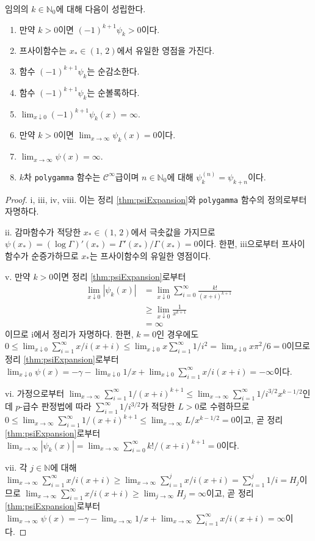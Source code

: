 \begin{theorem}
    임의의 $k\in\mathbb{N}_0$에 대해 다음이 성립한다.
    \begin{enumerate}
        \item 만약 $k>0$이면 $(-1)^{k+1}\psi_k>0$이다.
        \item 프사이함수는 $x_*\in(1,\,2)$에서 유일한 영점을 가진다.
        \item 함수 $(-1)^{k+1}\psi_k$는 순감소한다.
        \item 함수 $(-1)^{k+1}\psi_k$는 순볼록하다.
        \item $\lim_{x\downarrow0}(-1)^{k+1}\psi_k(x)=\infty$.
        \item 만약 $k>0$이면 $\lim_{x\to\infty}\psi_k(x)=0$이다.
        \item $\lim_{x\to\infty}\psi(x)=\infty$.
        \item $k$차 \texttt{polygamma} 함수는 $\mathcal{C}^\infty$급이며 $n\in\mathbb{N}_0$에 대해 $\psi_k^{(n)}=\psi_{k+n}$이다.
    \end{enumerate}
\end{theorem}

\begin{proof}
    i, iii, iv, viii. 이는 정리 \ref{thm:psiExpansion}와 \texttt{polygamma} 함수의 정의로부터 자명하다.

    ii. 감마함수가 적당한 $x_*\in(1,\,2)$에서 극솟값을 가지므로 $\psi(x_*)=(\log\Gamma)'(x_*)=\Gamma'(x_*)/\Gamma(x_*)=0$이다. 한편, iii으로부터 프사이함수가 순증가하므로 $x_*$는 프사이함수의 유일한 영점이다.

    v. 만약 $k>0$이면 정리 \ref{thm:psiExpansion}로부터
    \begin{align*}
        \lim_{x\downarrow0}|\psi_k(x)|&=\lim_{x\downarrow0}\sum_{i=0}^\infty\frac{k!}{(x+i)^{k+1}}\\
        &\geq\lim_{x\downarrow0}\frac{1}{x^{k+1}}\\
        &=\infty
    \end{align*}
    이므로 i에서 정리가 자명하다. 한편, $k=0$인 경우에도 $0\leq\lim_{x\downarrow0}\sum_{i=1}^\infty x/i(x+i)\leq\lim_{x\downarrow0}x\sum_{i=1}^\infty1/i^2=\lim_{x\downarrow0}x\pi^2/6=0$이므로 정리 \ref{thm:psiExpansion}로부터 $\lim_{x\downarrow0}\psi(x)=-\gamma-\lim_{x\downarrow0}1/x+\lim_{x\downarrow0}\sum_{i=1}^\infty x/i(x+i)=-\infty$이다.

    vi. 가정으로부터 $\lim_{x\to\infty}\sum_{i=1}^\infty1/(x+i)^{k+1}\leq\lim_{x\to\infty}\sum_{i=1}^\infty1/i^{3/2}x^{k-1/2}$인데 $p$-급수 판정법에 따라 $\sum_{i=1}^\infty1/i^{3/2}$가 적당한 $L>0$로 수렴하므로 $0\leq\lim_{x\to\infty}\sum_{i=1}^\infty1/(x+i)^{k+1}\leq\lim_{x\to\infty}L/x^{k-1/2}=0$이고, 곧 정리 \ref{thm:psiExpansion}로부터 $\lim_{x\to\infty}|\psi_k(x)|=\lim_{x\to\infty}\sum_{i=0}^\infty k!/(x+i)^{k+1}=0$이다.
    
    vii. 각 $j\in\mathbb{N}$에 대해 $\lim_{x\to\infty}\sum_{i=1}^\infty x/i(x+i)\geq\lim_{x\to\infty}\sum_{i=1}^jx/i(x+i)=\sum_{i=1}^j1/i=H_j$이므로 $\lim_{x\to\infty}\sum_{i=1}^\infty x/i(x+i)\geq\lim_{j\to\infty}H_j=\infty$이고, 곧 정리 \ref{thm:psiExpansion}로부터 $\lim_{x\to\infty}\psi(x)=-\gamma-\lim_{x\to\infty}1/x+\lim_{x\to\infty}\sum_{i=1}^\infty x/i(x+i)=\infty$이다.
\end{proof}


